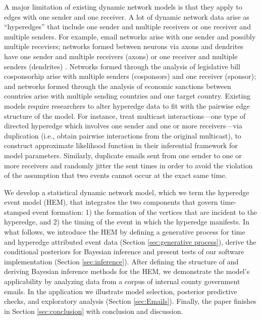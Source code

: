 \documentclass[ba]{imsart}
\numberwithin{equation}{section}
\theoremstyle{plain}
\begin{document}
	A major limitation of existing dynamic network models is that they apply to edges with one sender and one receiver. A lot of dynamic network data arise as ``hyperedges'' \citep{karypis1999multilevel,ghoshal2009random,zlatic2009hypergraph,zhang2010hypergraph} that include one sender and multiple receivers or one receiver and multiple senders. For example, email networks \citep{newman2002email} arise with one sender and possibly multiple receviers;  networks formed between neurons via axons and dendrites have one sender and multiple receivers (axons) or one receiver and multiple senders (dendrites) \citep{partzsch2012developing}. Networks formed through the analysis of legislative bill cosponsorhip \citep{fowler2006legislative} arise with multiple senders (cosponsors) and one receiver (sponsor); and networks formed through the analysis of economic sanctions \citep{cranmer2014reciprocity} between countries arise with multiple sending countries and one target country. Existing models require researchers to alter hyperedge data to fit with the pairwise edge structure of the model. For instance, \cite{PerryWolfe2012} treat multicast interactions---one type of directed hyperedge which involves one sender and one or more receivers---via duplication (i.e., obtain pairwise interactions from the original multicast), to construct approximate likelihood function in their inferential framework for model parameters. Similarly, \cite{fan2009learning} duplicate emails sent from one sender to one or more receivers and randomly jitter the sent times in order to avoid the violation of the assumption that two events cannot occur at the exact same time. %
	
	We develop a statistical dynamic network model, which we term the hyperedge event model (HEM), that integrates the two components that govern time-stamped event formation: 1) the formation of the vertices that are incident to the hyperedge, and 2) the timing of the event in which the hyperedge manifests. In what follows, we introduce the HEM by defining a generative process for time and hyperedge attributed event data (Section \ref{sec:generative process}), derive the conditional posteriors for Bayesian inference and present tests of our software implementation (Section \ref{sec:inference}). After defining the structure of and deriving Bayesian inference methods for the HEM, we demonstrate the model's applicability by analyzing data from a corpus of internal county government emails.  In the application we illustrate model selection, posterior predictive checks, and exploratory analysis (Section \ref{sec:Emails}). Finally, the paper finishes in Section \ref{sec:conclusion} with conclusion and discussion.
	
\end{document}
